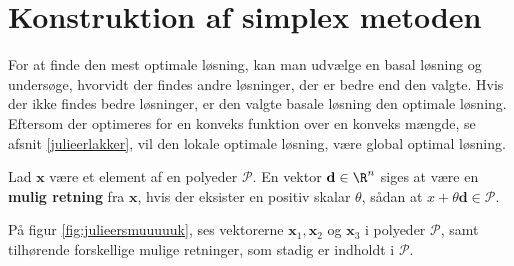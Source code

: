 %
\section{Konstruktion af simplex metoden}
%
For at finde den mest optimale løsning, kan man udvælge en basal løsning og undersøge, hvorvidt der findes andre løsninger, der er bedre end den valgte. 
Hvis der ikke findes bedre løsninger, er den valgte basale løsning den optimale løsning. 
Eftersom der optimeres for en konveks funktion over en konveks mængde, se afsnit \ref{julieerlakker}, %
vil den lokale optimale løsning, være global optimal løsning. 
%
%
\begin{defn}{}{}
Lad $\textbf{x}$ være et element af en polyeder $\mathcal{P}$.
En vektor $\textbf{d}\in \R^n$ siges at være en  \textbf{mulig retning} fra $\textbf{x}$, hvis der eksister en positiv skalar $\theta$, sådan at $x+\theta \textbf{d}\in \mathcal{P}$.
\end{defn}
\noindent
%
På figur \ref{fig:julieersmuuuuuk}, ses vektorerne $\mathbf{x}_1, \mathbf{x}_2$ og $\mathbf{x}_3$ i polyeder $\mathcal{P}$, samt tilhørende forskellige mulige retninger, som stadig er indholdt i $\mathcal{P}$.
%

%
%